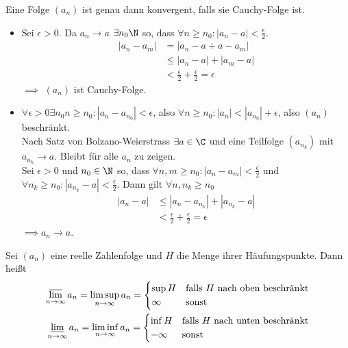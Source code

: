 \begin{theorem}
	Eine Folge $(a_n)$ ist genau dann konvergent, falls sie Cauchy-Folge ist.
\end{theorem}
\prove 
\begin{itemize}
	\item[$\Rightarrow$] Sei $\epsilon >0$. Da $a_n \to a$ $\exists n_0 \N$ so, dass $\forall n \geq n_0: |a_n-a|<\frac{\epsilon}{2}$.
	\begin{align*}
		|a_n-a_m|&=|a_n-a+a-a_m|\\
		&\leq |a_n-a|+|a_m-a|\\
		&< \frac{\epsilon}{2}+\frac{\epsilon}{2}=\epsilon
	\end{align*} 
	$\implies$ $(a_n)$ ist Cauchy-Folge.
	\item[$\Leftarrow$] $\forall \epsilon >0 \exists n_0 n\geq n_0: |a_n-a_{n_0}|<\epsilon$, also $\forall n \geq n_0: |a_n| < |a_{n_0}| +\epsilon$, also $(a_n)$ beschränkt.\\
	Nach Satz von Bolzano-Weierstrass $\exists a \in \C$ und eine Teilfolge $(a_{n_k})$ mit $a_{n_k}\to a$. Bleibt für alle $a_n$ zu zeigen.\\
	Sei $\epsilon > 0$ und $n_0\in \N$ so, dass $\forall n,m \geq n_0: |a_n-a_m|<\frac{\epsilon}{2}$ und $\forall n_k \geq n_0: |a_{n_k}-a|<\frac{\epsilon}{2}$. Dann gilt $\forall n, n_k\geq n_0$
	\begin{align*}
		|a_n-a|&\leq |a_n-a_{n_k}|+|a_{n_k}-a|\\
		&< \frac{\epsilon}{2} + \frac{\epsilon}{2} = \epsilon
	\end{align*}
	$\implies a_n \to a$. 
\end{itemize}
\begin{definition}
	Sei $(a_n)$ eine reelle Zahlenfolge und $H$ die Menge ihrer Häufungspunkte. Dann heißt
	\begin{align*}
		\varlimsup\limits_{n\to \infty}a_n = \limsup\limits_{n\to \infty} a_n =\begin{cases}
			\sup H& \text{falls $H$ nach oben beschränkt}\\
			\infty& \text{sonst}
		\end{cases}\\
		\varliminf\limits_{n\to \infty}a_n = \liminf\limits_{n\to \infty} a_n =\begin{cases}
			\inf H& \text{falls $H$ nach unten beschränkt}\\
			-\infty& \text{sonst}
		\end{cases}
	\end{align*}
\end{definition}
